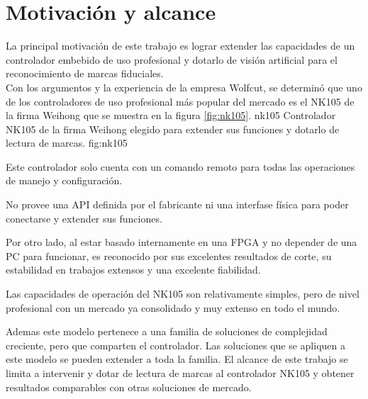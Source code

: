 \section{Motivación y alcance}
   La principal motivación de este trabajo es lograr extender las capacidades de un controlador embebido de uso profesional y dotarlo de visión artificial para el reconocimiento de marcas fiduciales. \\
   Con los argumentos y la experiencia de la empresa Wolfcut, se determinó que uno de los controladores de uso profesional más popular del mercado es el NK105 de la firma Weihong \citep{WEBSITE:nk105} que se muestra en la figura \ref{fig:nk105}.
      {nk105}
      {Controlador NK105 de la firma Weihong elegido para extender sus funciones y dotarlo de lectura de marcas.}
      {fig:nk105}

   Este controlador solo cuenta con un comando remoto para todas las operaciones de manejo y configuración.\par
   No provee una API definida por el fabricante ni una interfase física para poder conectarse y extender sus funciones. \par
   Por otro lado, al estar basado internamente en una FPGA y no depender de una PC para funcionar, es reconocido por sus excelentes resultados de corte, su estabilidad en trabajos extensos y una excelente fiabilidad. \par
   Las capacidades de operación del NK105 son relativamente simples, pero de nivel profesional con un mercado ya consolidado y muy extenso en todo el mundo.\par
   Ademas este modelo pertenece a una familia de soluciones de complejidad creciente, pero que comparten el controlador. Las soluciones que se apliquen a este modelo se pueden extender a toda la familia.
   El alcance de este trabajo se limita a intervenir y dotar de lectura de marcas al controlador NK105 y obtener resultados comparables con otras soluciones de mercado.

